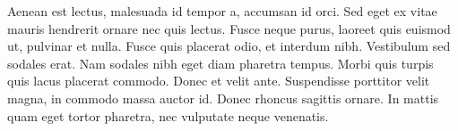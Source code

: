 
Aenean est lectus, malesuada id tempor a, accumsan id orci. Sed eget ex vitae mauris hendrerit ornare nec quis lectus. Fusce neque purus, laoreet quis euismod ut, pulvinar et nulla. Fusce quis placerat odio, et interdum nibh. Vestibulum sed sodales erat. Nam sodales nibh eget diam pharetra tempus. Morbi quis turpis quis lacus placerat commodo. Donec et velit ante. Suspendisse porttitor velit magna, in commodo massa auctor id. Donec rhoncus sagittis ornare. In mattis quam eget tortor pharetra, nec vulputate neque venenatis.
